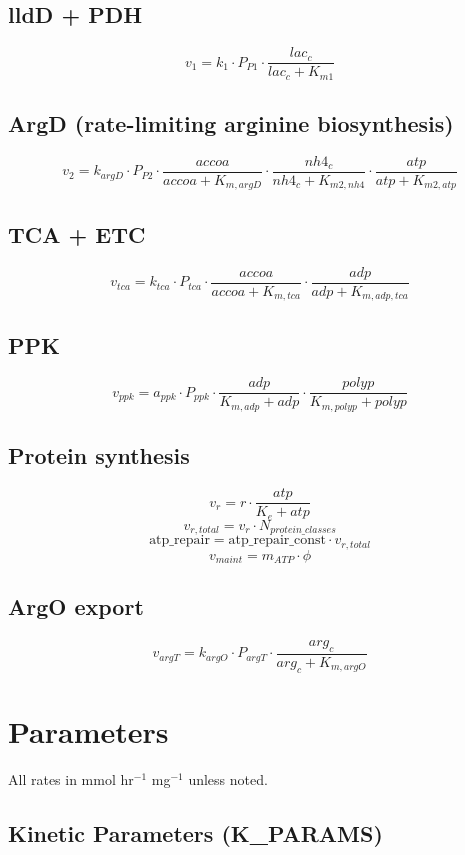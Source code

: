\documentclass{article}
\begin{document}
\subsection{lldD + PDH}
\[
v_1 = k_1 \cdot P_{P1} \cdot \frac{lac_c}{lac_c + K_{m1}}
\]

\subsection{ArgD (rate-limiting arginine biosynthesis)}
\[
v_2 = k_{argD} \cdot P_{P2} \cdot \frac{accoa}{accoa + K_{m,argD}} \cdot \frac{nh4_c}{nh4_c + K_{m2,nh4}} \cdot \frac{atp}{atp + K_{m2,atp}}
\]

\subsection{TCA + ETC}
\[
v_{tca} = k_{tca} \cdot P_{tca} \cdot \frac{accoa}{accoa + K_{m,tca}} \cdot \frac{adp}{adp + K_{m,adp,tca}}
\]

\subsection{PPK}
\[
v_{ppk} = a_{ppk} \cdot P_{ppk} \cdot \frac{adp}{K_{m,adp} + adp} \cdot \frac{polyp}{K_{m,polyp} + polyp}
\]

\subsection{Protein synthesis}
\[
v_r = r \cdot \frac{atp}{K_e + atp}
\]
\[
v_{r,total} = v_r \cdot N_{protein\_classes}
\]
\[
\text{atp\_repair} = \text{atp\_repair\_const} \cdot v_{r,total}
\]
\[
v_{maint} = m_{ATP} \cdot \phi
\]

\subsection{ArgO export}
\[
v_{argT} = k_{argO} \cdot P_{argT} \cdot \frac{arg_c}{arg_c + K_{m,argO}}
\]

\section{Parameters}

All rates in mmol hr$^{-1}$ mg$^{-1}$ unless noted.

\subsection{Kinetic Parameters (K\_PARAMS)}
\end{document}
